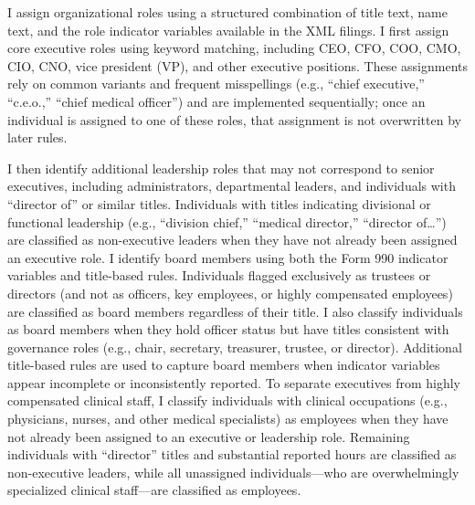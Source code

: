 \documentclass[12pt]{article}
\begin{document}
    I assign organizational roles using a structured combination of title text, name text, and the role indicator variables available in the XML filings. I first assign core executive roles using keyword matching, including CEO, CFO, COO, CMO, CIO, CNO, vice president (VP), and other executive positions. These assignments rely on common variants and frequent misspellings (e.g., “chief executive,” “c.e.o.,” “chief medical officer”) and are implemented sequentially; once an individual is assigned to one of these roles, that assignment is not overwritten by later rules.
    
    I then identify additional leadership roles that may not correspond to senior executives, including administrators, departmental leaders, and individuals with “director of” or similar titles. Individuals with titles indicating divisional or functional leadership (e.g., “division chief,” “medical director,” “director of…”) are classified as non-executive leaders when they have not already been assigned an executive role. I identify board members using both the Form 990 indicator variables and title-based rules. Individuals flagged exclusively as trustees or directors (and not as officers, key employees, or highly compensated employees) are classified as board members regardless of their title. I also classify individuals as board members when they hold officer status but have titles consistent with governance roles (e.g., chair, secretary, treasurer, trustee, or director). Additional title-based rules are used to capture board members when indicator variables appear incomplete or inconsistently reported. To separate executives from highly compensated clinical staff, I classify individuals with clinical occupations (e.g., physicians, nurses, and other medical specialists) as employees when they have not already been assigned to an executive or leadership role. Remaining individuals with “director” titles and substantial reported hours are classified as non-executive leaders, while all unassigned individuals—who are overwhelmingly specialized clinical staff—are classified as employees.
\end{document}

